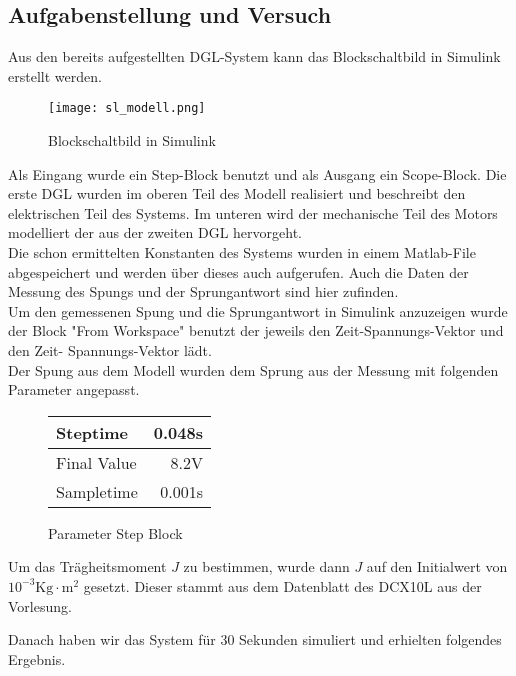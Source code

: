 \subsection{Aufgabenstellung und Versuch}

Aus den bereits aufgestellten DGL-System kann das Blockschaltbild in Simulink
erstellt werden.

\begin{figure}[H]
    \centering
    \texttt{[image: sl\_modell.png]}
    \caption{Blockschaltbild in Simulink}
    \label{fig:Blockschaltbild}
\end{figure}

Als Eingang wurde ein Step-Block benutzt und als Ausgang ein Scope-Block.
Die erste DGL wurden im oberen Teil des Modell realisiert und beschreibt
den elektrischen Teil des Systems. Im unteren wird der mechanische Teil
des Motors modelliert der aus der zweiten DGL hervorgeht.\\

Die schon ermittelten Konstanten des Systems wurden in einem Matlab-File
abgespeichert und werden über dieses auch aufgerufen. Auch die Daten der
Messung des Spungs und der Sprungantwort sind hier zufinden.\\

Um den gemessenen Spung und die Sprungantwort in Simulink anzuzeigen wurde der Block
"From Workspace" benutzt der jeweils den Zeit-Spannungs-Vektor und den Zeit-
Spannungs-Vektor lädt.\\

Der Spung aus dem Modell wurden dem Sprung aus der Messung mit folgenden
Parameter angepasst.\\

\begin{figure}[H]
    \centering    
    \begin{tabular}[h]{l| r}
        Steptime & 0.048s \\
        \hline
        Final Value & 8.2V \\
        \hline
        Sampletime & 0.001s \\
    \end{tabular}
    \caption{Parameter Step Block}
\end{figure}
    

Um das Trägheitsmoment $J$ zu bestimmen, wurde dann $J$ auf den Initialwert
von $10^{-3}\mathrm{Kg \cdot m^2}$ gesetzt. Dieser stammt aus dem Datenblatt
des DCX10L aus der Vorlesung.

Danach haben wir das System für 30 Sekunden simuliert und erhielten folgendes
Ergebnis.

